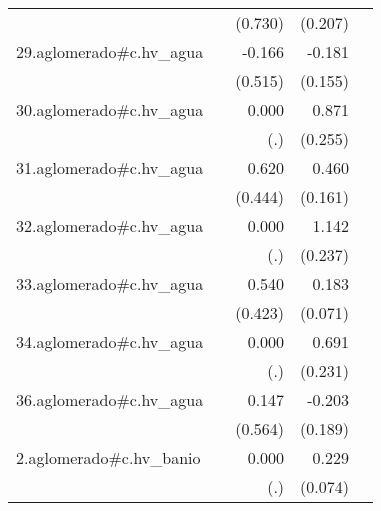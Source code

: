 {\begin{longtable}{l*{4}{D{.}{.}{-1}}}
            &                     &     (0.730)         &     (0.207)         &                     \\
\addlinespace
29.aglomerado#c.hv\_agua&                     &      -0.166         &      -0.181         &                     \\
            &                     &     (0.515)         &     (0.155)         &                     \\
\addlinespace
30.aglomerado#c.hv\_agua&                     &       0.000         &       0.871\sym{***}&                     \\
            &                     &         (.)         &     (0.255)         &                     \\
\addlinespace
31.aglomerado#c.hv\_agua&                     &       0.620         &       0.460\sym{**} &                     \\
            &                     &     (0.444)         &     (0.161)         &                     \\
\addlinespace
32.aglomerado#c.hv\_agua&                     &       0.000         &       1.142\sym{***}&                     \\
            &                     &         (.)         &     (0.237)         &                     \\
\addlinespace
33.aglomerado#c.hv\_agua&                     &       0.540         &       0.183\sym{*}  &                     \\
            &                     &     (0.423)         &     (0.071)         &                     \\
\addlinespace
34.aglomerado#c.hv\_agua&                     &       0.000         &       0.691\sym{**} &                     \\
            &                     &         (.)         &     (0.231)         &                     \\
\addlinespace
36.aglomerado#c.hv\_agua&                     &       0.147         &      -0.203         &                     \\
            &                     &     (0.564)         &     (0.189)         &                     \\
\addlinespace
2.aglomerado#c.hv\_banio&                     &       0.000         &       0.229\sym{**} &                     \\
            &                     &         (.)         &     (0.074)         &                     \\

\end{longtable}}
